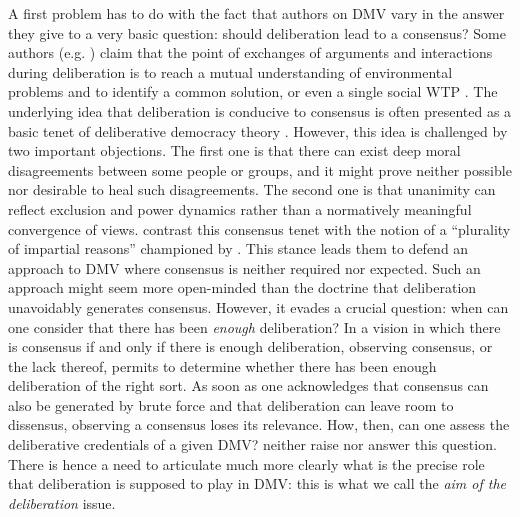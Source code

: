 \documentclass[version=3.21, pagesize, twoside=off, bibliography=totoc, DIV=calc, fontsize=12pt, a4paper, french, english]{scrartcl}
\begin{document}
A first problem has to do with the fact that authors on DMV vary in the answer they give to a very basic question: should deliberation lead to a consensus? Some authors (e.g. \citet{vatn_institutional_2009}) claim that the point of exchanges of arguments and interactions during deliberation is to reach a mutual understanding of environmental problems and to identify a common solution, or even a single social WTP \citep{orchard-webb_deliberative_2016}. The underlying idea that deliberation is conducive to consensus is often presented as a basic tenet of deliberative democracy theory \citep{wilson_discourse-based_2002}. 
However, this idea is challenged by two important objections.
The first one is that there can exist deep moral disagreements \citep{dryzek_deliberative_2013} between some people or groups, and it might prove neither possible nor desirable to heal such disagreements.
The second one is that unanimity can reflect exclusion and power dynamics \citep{elster_sour_1983,volker_exploring_2016,vargas_background_2016,vargas_problem_2017,murphy_comparing_2017} rather than a normatively meaningful convergence of views.
\citeauthor{bartkowski_beyond_2018} contrast this consensus tenet with the notion of a ``plurality of impartial reasons'' championed by \citet{sen_idea_2009}.
This stance leads them to defend an approach to DMV where consensus is neither required nor expected. Such an approach might seem more open-minded than the doctrine that deliberation unavoidably generates consensus. However, it evades a crucial question: when can one consider that there has been \emph{enough} deliberation? 
In a vision in which there is consensus if and only if there is enough deliberation, observing consensus, or the lack thereof, permits to determine whether there has been enough deliberation of the right sort.
As soon as one acknowledges that consensus can also be generated by brute force and that deliberation can leave room to dissensus, observing a consensus loses its relevance. 
How, then, can one assess the deliberative credentials of a given DMV? 
\citeauthor{bartkowski_beyond_2018} neither raise nor answer this question.
There is hence a need to articulate much more clearly what is the precise role that deliberation is supposed to play in DMV: this is what we call the \emph{aim of the deliberation} issue.
\end{document}
